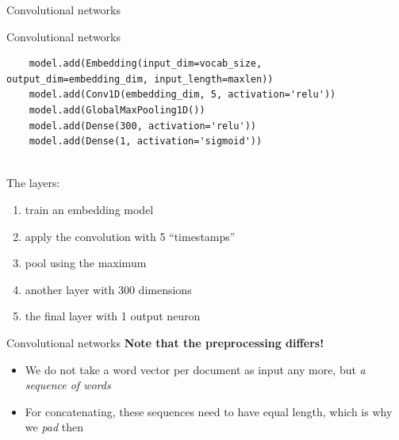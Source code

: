 \documentclass[compress]{beamer}
\begin{document}
\begin{frame}{Convolutional networks}
	
\end{frame}



\begin{frame}[fragile]{Convolutional networks}
	\begin{lstlisting}
	model.add(Embedding(input_dim=vocab_size, output_dim=embedding_dim, input_length=maxlen))
	model.add(Conv1D(embedding_dim, 5, activation='relu'))
	model.add(GlobalMaxPooling1D())
	model.add(Dense(300, activation='relu'))
	model.add(Dense(1, activation='sigmoid'))
	
	\end{lstlisting}	
	The layers:	
	\begin{enumerate}[<+->]
		\item train an embedding model
		\item apply the convolution with 5 ``timestamps''
		\item pool using the maximum
		\item another layer with 300 dimensions
		\item the final layer with 1 output neuron
	\end{enumerate}
\end{frame}


\begin{frame}{Convolutional networks}
	\textbf{Note that the preprocessing differs!}
	
	\begin{itemize}
		\item We do not take a word vector per document as input any more, but \emph{a sequence of words}
		\item For concatenating, these sequences need to have equal length, which is why we \emph{pad} then
	\end{itemize}
	
\end{frame}
\end{document}
